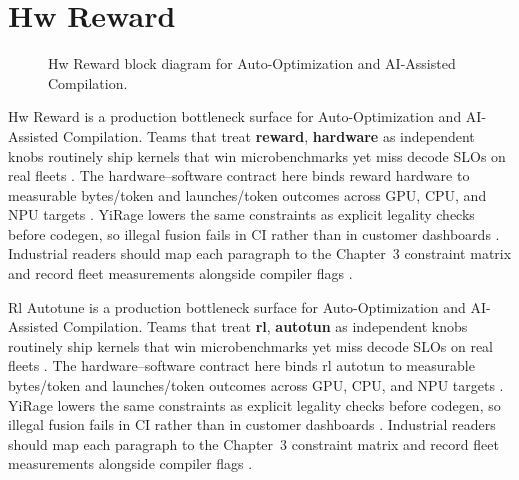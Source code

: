 \section{Hw Reward}
\label{sec:hw_reward}
\begin{figure}[t]
\centering
{}
\caption{Hw Reward block diagram for Auto-Optimization and AI-Assisted Compilation.}
\label{fig:hw_reward_architecture}
\end{figure}


Hw Reward is a production bottleneck surface for Auto-Optimization and AI-Assisted Compilation. Teams that treat \textbf{reward}, \textbf{hardware} as independent knobs routinely ship kernels that win microbenchmarks yet miss decode SLOs on real fleets \citep{taxbreak2026,semianalysis2024tma}. The hardware--software contract here binds reward hardware to measurable bytes/token and launches/token outcomes across GPU, CPU, and NPU targets \citep{memoryfloor2026,amd2024xdna}. YiRage lowers the same constraints as explicit legality checks before codegen, so illegal fusion fails in CI rather than in customer dashboards \citep{nvidia2022hopper,amd2024aie}. Industrial readers should map each paragraph to the Chapter~3 constraint matrix and record fleet measurements alongside compiler flags \citep{semianalysis2024tma,dlbook}.

Rl Autotune is a production bottleneck surface for Auto-Optimization and AI-Assisted Compilation. Teams that treat \textbf{rl}, \textbf{autotun} as independent knobs routinely ship kernels that win microbenchmarks yet miss decode SLOs on real fleets \citep{liu2024deepseekv3,memoryfloor2026}. The hardware--software contract here binds rl autotun to measurable bytes/token and launches/token outcomes across GPU, CPU, and NPU targets \citep{patel2025llminference,nvidia2022hopper}. YiRage lowers the same constraints as explicit legality checks before codegen, so illegal fusion fails in CI rather than in customer dashboards \citep{taxbreak2026,semianalysis2024tma}. Industrial readers should map each paragraph to the Chapter~3 constraint matrix and record fleet measurements alongside compiler flags \citep{memoryfloor2026,amd2024xdna}.

